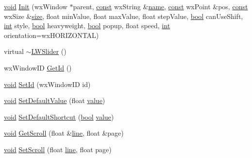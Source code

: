 \begin{DoxyCompactItemize}
\item 
\hyperlink{sound_8c_ae35f5844602719cf66324f4de2a658b3}{void} \hyperlink{class_l_w_slider_a80f02fb53971c5a3a5b5cfa41d4d692a}{Init} (wx\+Window $\ast$parent, \hyperlink{getopt1_8c_a2c212835823e3c54a8ab6d95c652660e}{const} wx\+String \&\hyperlink{lib_2expat_8h_a1b49b495b59f9e73205b69ad1a2965b0}{name}, \hyperlink{getopt1_8c_a2c212835823e3c54a8ab6d95c652660e}{const} wx\+Point \&pos, \hyperlink{getopt1_8c_a2c212835823e3c54a8ab6d95c652660e}{const} wx\+Size \&\hyperlink{group__lavu__mem_ga854352f53b148adc24983a58a1866d66}{size}, float min\+Value, float max\+Value, float step\+Value, \hyperlink{mac_2config_2i386_2lib-src_2libsoxr_2soxr-config_8h_abb452686968e48b67397da5f97445f5b}{bool} can\+Use\+Shift, \hyperlink{xmltok_8h_a5a0d4a5641ce434f1d23533f2b2e6653}{int} style, \hyperlink{mac_2config_2i386_2lib-src_2libsoxr_2soxr-config_8h_abb452686968e48b67397da5f97445f5b}{bool} heavyweight, \hyperlink{mac_2config_2i386_2lib-src_2libsoxr_2soxr-config_8h_abb452686968e48b67397da5f97445f5b}{bool} popup, float speed, \hyperlink{xmltok_8h_a5a0d4a5641ce434f1d23533f2b2e6653}{int} orientation=wx\+H\+O\+R\+I\+Z\+O\+N\+T\+AL)
\item 
virtual \hyperlink{class_l_w_slider_aae3137a516cb9ffe4a72dd67a22721fc}{$\sim$\+L\+W\+Slider} ()
\item 
wx\+Window\+ID \hyperlink{class_l_w_slider_a8c48321d6663df65baa32fe3d4f48bd4}{Get\+Id} ()
\item 
\hyperlink{sound_8c_ae35f5844602719cf66324f4de2a658b3}{void} \hyperlink{class_l_w_slider_ab19f81ee4054ca5ac67dcaaea534565f}{Set\+Id} (wx\+Window\+ID id)
\item 
\hyperlink{sound_8c_ae35f5844602719cf66324f4de2a658b3}{void} \hyperlink{class_l_w_slider_a6a0d8803697d5a8d2905b44838ccbc69}{Set\+Default\+Value} (float \hyperlink{lib_2expat_8h_a4a30a13b813682e68c5b689b45c65971}{value})
\item 
\hyperlink{sound_8c_ae35f5844602719cf66324f4de2a658b3}{void} \hyperlink{class_l_w_slider_a94b52f71d125518047cd8b7c02f81c7d}{Set\+Default\+Shortcut} (\hyperlink{mac_2config_2i386_2lib-src_2libsoxr_2soxr-config_8h_abb452686968e48b67397da5f97445f5b}{bool} \hyperlink{lib_2expat_8h_a4a30a13b813682e68c5b689b45c65971}{value})
\item 
\hyperlink{sound_8c_ae35f5844602719cf66324f4de2a658b3}{void} \hyperlink{class_l_w_slider_a857b75ee465bc417ead729b5e4f65e70}{Get\+Scroll} (float \&\hyperlink{seqread_8c_aad9ebcdde542d8b2075615388ff15a9c}{line}, float \&page)
\item 
\hyperlink{sound_8c_ae35f5844602719cf66324f4de2a658b3}{void} \hyperlink{class_l_w_slider_aaa457a182a3216e7a87f4b9ecf440cd0}{Set\+Scroll} (float \hyperlink{seqread_8c_aad9ebcdde542d8b2075615388ff15a9c}{line}, float page)

\end{DoxyCompactItemize}

